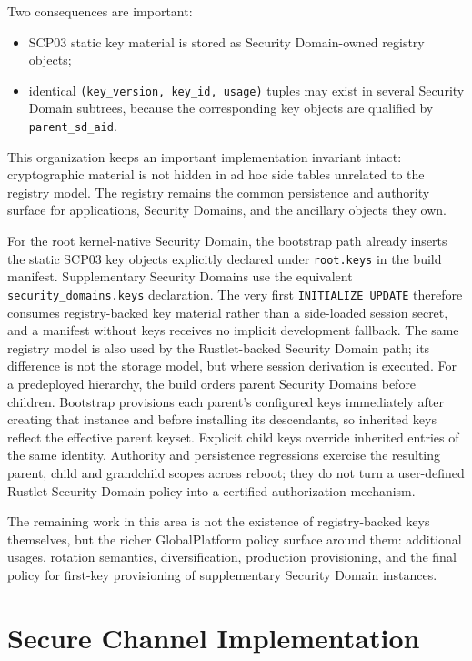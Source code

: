 Two consequences are important:
\begin{itemize}
\item SCP03 static key material is stored as Security Domain-owned registry
      objects;
\item identical \texttt{(key\_version, key\_id, usage)} tuples may exist in
      several Security Domain subtrees, because the corresponding key objects
      are qualified by \texttt{parent\_sd\_aid}.
\end{itemize}

This organization keeps an important implementation invariant intact:
cryptographic material is not hidden in ad hoc side tables unrelated to the
registry model. The registry remains the common persistence and authority
surface for applications, Security Domains, and the ancillary objects they
own.

For the root kernel-native Security Domain, the bootstrap path already inserts
the static SCP03 key objects explicitly declared under \texttt{root.keys} in
the build manifest. Supplementary Security Domains use the equivalent
\texttt{security\_domains.keys} declaration. The very first
\texttt{INITIALIZE UPDATE} therefore consumes registry-backed key material
rather than a side-loaded session secret, and a manifest without keys receives
no implicit development fallback. The same registry model is also used by the
Rustlet-backed Security Domain path; its difference is not the storage model,
but where session derivation is executed.
For a predeployed hierarchy, the build orders parent Security Domains before
children. Bootstrap provisions each parent's configured keys immediately after
creating that instance and before installing its descendants, so inherited
keys reflect the effective parent keyset. Explicit child keys override
inherited entries of the same identity. Authority and persistence regressions
exercise the resulting parent, child and grandchild scopes across reboot; they
do not turn a user-defined Rustlet Security Domain policy into a certified
authorization mechanism.

The remaining work in this area is not the existence of registry-backed keys
themselves, but the richer GlobalPlatform policy surface around them:
additional usages, rotation semantics, diversification, production
provisioning, and the final policy for first-key provisioning of supplementary
Security Domain instances.


\section{Secure Channel Implementation}
\label{sec:impl-scp}

